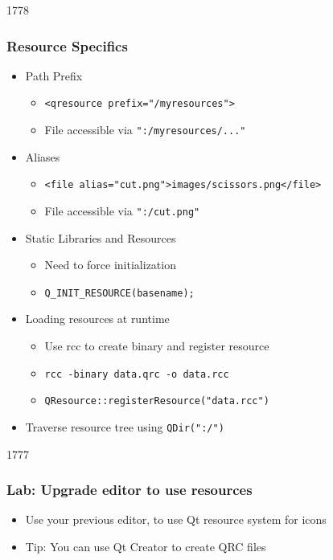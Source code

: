 \begin{slide}{1778}\frametitle{Resource Specifics}
  \begin{itemize}
  \item Path Prefix
    \begin{itemize}
    \item \texttt{<qresource prefix="/myresources">}
    \item File accessible via \texttt{":/myresources/..."}
    \end{itemize}
  \item Aliases
    \begin{itemize}
    \item \texttt{<file alias="cut.png">images/scissors.png</file>}
    \item File accessible via \texttt{":/cut.png"}
    \end{itemize}
  \item Static Libraries and Resources
    \begin{itemize}
    \item Need to force initialization
    \item \texttt{Q\_INIT\_RESOURCE(basename);}
    \end{itemize}
  \item Loading resources at runtime
    \begin{itemize}
    \item Use rcc to create binary and register resource
    \item \texttt{rcc -binary data.qrc -o data.rcc}
    \item \texttt{QResource::registerResource("data.rcc")}
    \end{itemize}
  \item Traverse resource tree using \texttt{QDir(":/")}
  \end{itemize}
\end{slide}


\begin{slide}{1777}
  \frametitle{Lab: Upgrade editor to use resources}
  \begin{itemize}
  \item Use your previous editor, to use Qt resource system for icons
  \item Tip: You can use Qt Creator to create QRC files
  \end{itemize}
\end{slide}

